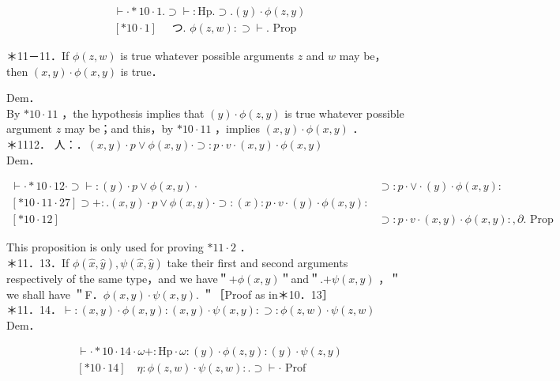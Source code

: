 \documentclass[10pt]{article}
\begin{document}
$$
\begin{aligned}
& \vdash \cdot * 10 \cdot 1 . \supset \vdash: \mathrm{Hp} . \supset .(y) \cdot \phi(z, y) \\
& {[* 10 \cdot 1] \quad \text { つ. } \phi(z, w): \supset \vdash . \text { Prop }}
\end{aligned}
$$

＊11－11．If $\phi(z, w)$ is true whatever possible arguments $z$ and $w$ may be，then $(x, y) \cdot \phi(x, y)$ is true．

Dem．\\
By $* 10 \cdot 11$ ，the hypothesis implies that $(y) \cdot \phi(z, y)$ is true whatever possible argument $z$ may be；and this，by $* 10 \cdot 11$ ，implies $(x, y) \cdot \phi(x, y)$ ．\\
＊1112． 人：．$(x, y) \cdot p \vee \phi(x, y) \cdot \supset: p \cdot v \cdot(x, y) \cdot \phi(x, y)$\\
Dem．

$$
\begin{array}{ll}
\vdash \cdot * 10 \cdot 12 \cdot \supset \vdash:(y) \cdot p \vee \phi(x, y) \cdot & \supset: p \cdot \vee \cdot(y) \cdot \phi(x, y): \\
{[* 10 \cdot 11 \cdot 27] \supset+: .(x, y) \cdot p \vee \phi(x, y) \cdot \supset:(x): p \cdot v \cdot(y) \cdot \phi(x, y):} \\
{[* 10 \cdot 12]} & \supset: p \cdot v \cdot(x, y) \cdot \phi(x, y):, \partial \text {. Prop }
\end{array}
$$

This proposition is only used for proving $* 11 \cdot 2$ ．\\
＊11．13．If $\phi(\hat{x}, \hat{y}), \psi(\hat{x}, \hat{y})$ take their first and second arguments respectively of the same type，and we have＂$+\phi(x, y)$＂and＂.$+ \psi(x, y)$ ，＂we shall have ＂F．$\phi(x, y) \cdot \psi(x, y)$. ＂［Proof as in＊10．13］\\
＊11．14．$\vdash:(x, y) \cdot \phi(x, y):(x, y) \cdot \psi(x, y): \supset: \phi(z, w) \cdot \psi(z, w)$\\
Dem．

$$
\begin{aligned}
& \vdash \cdot * 10 \cdot 14 \cdot \omega+: \mathrm{Hp} \cdot \omega:(y) \cdot \phi(z, y):(y) \cdot \psi(z, y) \\
& {[* 10 \cdot 14] \quad \eta: \phi(z, w) \cdot \psi(z, w): . \supset \vdash \cdot \text { Prof }}
\end{aligned}
$$
\end{document}
